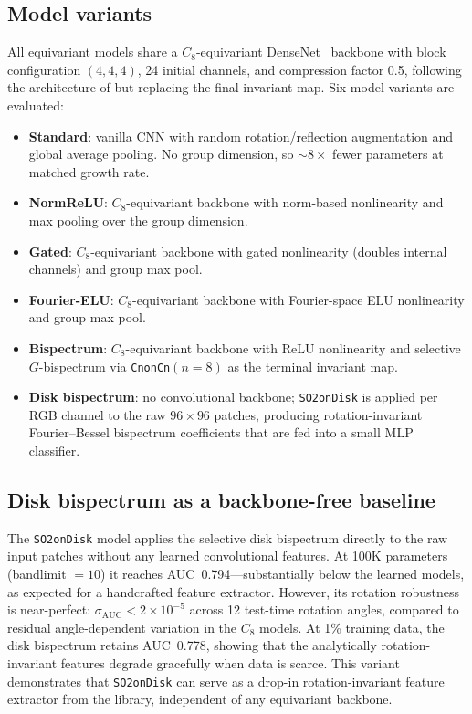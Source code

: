 \documentclass{article}
\begin{document}
\subsection{Model variants}

All equivariant models share a $C_8$-equivariant
DenseNet~\citep{huang2017densenet} backbone with block configuration
$(4, 4, 4)$, 24 initial channels, and compression factor 0.5,
following the architecture of \citet{veeling2018rotation} but
replacing the final invariant map. Six model variants are evaluated:

\begin{itemize}
  \item \textbf{Standard}: vanilla CNN with random rotation/reflection
    augmentation and global average pooling. No group dimension,
    so ${\sim}8\times$ fewer parameters at matched growth rate.
  \item \textbf{NormReLU}: $C_8$-equivariant backbone with norm-based
    nonlinearity and max pooling over the group dimension.
  \item \textbf{Gated}: $C_8$-equivariant backbone with gated
    nonlinearity (doubles internal channels) and group max pool.
  \item \textbf{Fourier-ELU}: $C_8$-equivariant backbone with
    Fourier-space ELU nonlinearity and group max pool.
  \item \textbf{Bispectrum}: $C_8$-equivariant backbone with ReLU
    nonlinearity and selective $G$-bispectrum via
    \texttt{CnonCn}$(n{=}8)$ as the terminal invariant map.
  \item \textbf{Disk bispectrum}: no convolutional backbone;
    \texttt{SO2onDisk} is applied per RGB channel to the raw
    $96 \times 96$ patches, producing rotation-invariant
    Fourier--Bessel bispectrum coefficients that are fed into a small
    MLP classifier.
\end{itemize}

\subsection{Disk bispectrum as a backbone-free baseline}

The \texttt{SO2onDisk} model applies the selective disk bispectrum
directly to the raw input patches without any learned convolutional
features. At 100K parameters (bandlimit $= 10$) it reaches
AUC~0.794---substantially below the learned models, as expected for a
handcrafted feature extractor. However, its rotation robustness is
near-perfect: $\sigma_{\text{AUC}} < 2 \times 10^{-5}$ across 12
test-time rotation angles, compared to residual angle-dependent
variation in the $C_8$ models. At 1\% training data, the disk
bispectrum retains AUC~0.778, showing that the analytically
rotation-invariant features degrade gracefully when data is scarce.
This variant demonstrates that \texttt{SO2onDisk} can serve as a
drop-in rotation-invariant feature extractor from the library,
independent of any equivariant backbone.
\end{document}

